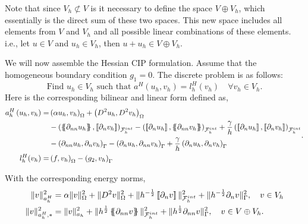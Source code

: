 Note that since $V_{h} \not\subset V $ is it necessary to define the space $V \oplus V_{h}$, which essentially is the direct sum of these two spaces. This new space includes all elements from $V$ and $V_h$ and all possible linear combinations of these elements. i.e., let $u \in V$ and $u_{h} \in V_{h}$, then $u + u_{h} \in V \oplus V_{h} $.

We will now assemble the Hessian CIP formulation.
Assume that the homogeneous boundary condition $g_{1}=0$.
The discrete problem is as follows:
 \begin{equation}
    \text{Find } u_{h} \in V_{h} \text{ such that } a^{H}( u_{h}, v_{h})  = l_{h}^{H}( v_{h} )  \quad \forall v_{h} \in  V_{h}.
\end{equation}
Here is the corresponding bilinear and linear form  defined as,
\begin{equation}
    \label{eq:hessian_form}
\begin{split}
a_{h}^{H} \left( u_{h}, v_{h} \right)   =&
    \left( \alpha  u_{h}, v_{h} \right) _{\Omega }   +  \left( D^2 u_{h}, D^2v_{h} \right) _{\Omega } \\
 & - \left( \mean{  \partial _{n n} u_{h} }, \jump{ \partial _{n }v_{h}} \right)_{\mathcal{F}_{h}^{int}}  -
 \left( \jump{ \partial _{n}u_{h} }, \mean{ \partial _{n n} v_{h} } \right)_{\mathcal{F}_{h}^{int}}  + \frac{\gamma }{h}  \left( \jump{ \partial _{n} u_{h}}, \jump{ \partial _{n} v_{h}   }   \right)_{\mathcal{F}_{h}^{int}} \\
 & - \left(   \partial _{n n} u_{h} ,  \partial _{n }v_{h} \right)_{\Gamma }  -
 \left( \partial _{n}u_{h} , \partial _{n n} v_{h}       \right)_{\Gamma }  + \frac{\gamma }{h}  \left(  \partial _{n} u_{h},  \partial _{n} v_{h}      \right)_{\Gamma }   \\
 l_{h}^{H}( v_{h})  =&  \left( f, v_{h} \right) _{\Omega }  - \left(g_{2}, v_{h}  \right) _{\Gamma }
\end{split}
.
\end{equation}

With the corresponding energy norms,
\begin{equation}
\label{eq:a_cip_energy_norm_hes}
    \begin{split}
 \| v \|_{ a_{h}^{H} }^{ 2 }& = \alpha  \| v\|_{ \Omega  }^{2  }  +  \| D ^2 v \|_{ \Omega   }^{ 2 }  + \|  h^{-\frac{1}{2}} \left[\!\left[  \partial _{n} v     \right]\!\right]\|_{  \mathcal{F} _{h}^{int} }^{2  }+ \|  h^{-\frac{1}{2}}  \partial _{n} v    \|_{  \Gamma  }^{2  },  \quad v \in V_{h}  \\
   \| v \|_{ a_{h}^{H},* }^{ 2 } &= \| v \|_{ a_{h} }^{ 2 }  + \| h^{\frac{1}{2}}  \left\{\!\!\left\{     \partial _{nn } v\right\}\!\!\right\}  \|_{ \mathcal{F}_{h}^{int}   }^{  2}+ \| h^{\frac{1}{2}} \partial _{nn } v  \|_{ \Gamma    }^{  2}, \quad  v\in V \oplus V_{h}.
    \end{split}
\end{equation}

